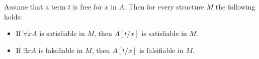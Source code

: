 

\setcounter{section}{2}
\setcounter{subsection}{1}
\setcounter{dfn}{2}

\begin{lem}
\label{lem:TermSubstitute}
Assume that a term $t$ is free for $x$ in $A$.
Then for every structure $M$ the following holds:
\begin{itemize}
\item
If $\forall x A$ is satisfiable in $M$, then $A[t/x]$ is satisfiable in $M$.
\item
If $\exists x A$ is falsifiable in $M$, then $A[t/x]$ is falsifiable in $M$.
\end{itemize}
\end{lem}


